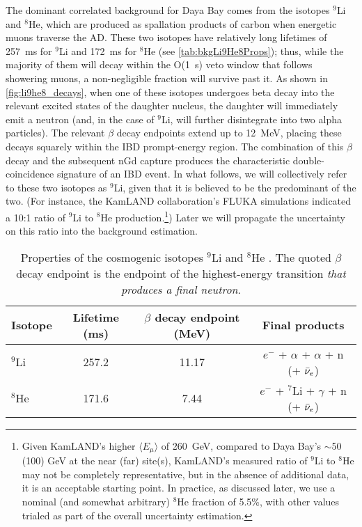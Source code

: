 \documentclass[../thesis.tex]{subfiles}
\begin{document}
\newcommand\linine{$^9$Li}

The dominant correlated background for Daya Bay comes from the isotopes $^9$Li and $^8$He, which are produced as spallation products of carbon when energetic muons traverse the AD. These two isotopes have relatively long lifetimes of 257~ms for $^9$Li and 172~ms for $^8$He \cite{ENDF} (see \autoref{tab:bkgLi9He8Props}); thus, while the majority of them will decay within the O(1~s) veto window that follows showering muons, a non-negligible fraction will survive past it. As shown in \autoref{fig:li9he8_decays}, when one of these isotopes undergoes beta decay into the relevant excited states of the daughter nucleus, the daughter will immediately emit a neutron (and, in the case of $^9$Li, will further disintegrate into two alpha particles). The relevant $\beta$ decay endpoints extend up to 12~MeV, placing these decays squarely within the IBD prompt-energy region. The combination of this $\beta$ decay and the subsequent nGd capture produces the characteristic double-coincidence signature of an IBD event. In what follows, we will collectively refer to these two isotopes as $^9$Li, given that it is believed to be the predominant of the two. (For instance, the KamLAND collaboration's FLUKA simulations \cite{KamLAND_cosmo} indicated a 10:1 ratio of $^9$Li to $^8$He production.\label{par:kamland_he8}\footnote{Given KamLAND's higher $\langle E_\mu \rangle$ of 260~GeV, compared to Daya Bay's $\sim$50 (100) GeV at the near (far) site(s), KamLAND's measured ratio of $^9$Li to $^8$He may not be completely representative, but in the absence of additional data, it is an acceptable starting point. In practice, as discussed later, we use a nominal (and somewhat arbitrary) $^8$He fraction of 5.5\%, with other values trialed as part of the overall uncertainty estimation.}) Later we will propagate the uncertainty on this ratio into the background estimation. 

\begin{table}[h]
  \begin{tabular}{lccc}
    \toprule
    Isotope & Lifetime (ms) & $\beta$ decay endpoint (MeV) & Final products \\
    \midrule
    $^9$Li & 257.2 & 11.17 & $e^-$ + $\alpha$ + $\alpha$ + n (+ $\bar\nu_e$)\\
    $^8$He & 171.6 & 7.44 & $e^-$ + $^7$Li  + $\gamma$ + n (+ $\bar\nu_e$)\\
    \bottomrule
  \end{tabular}
  \caption{Properties of the cosmogenic isotopes $^9$Li and $^8$He \cite{ENDF}. The quoted $\beta$ decay endpoint is the endpoint of the highest-energy transition \emph{that produces a final neutron}.}
  \label{tab:bkgLi9He8Props}
\end{table}
\end{document}
